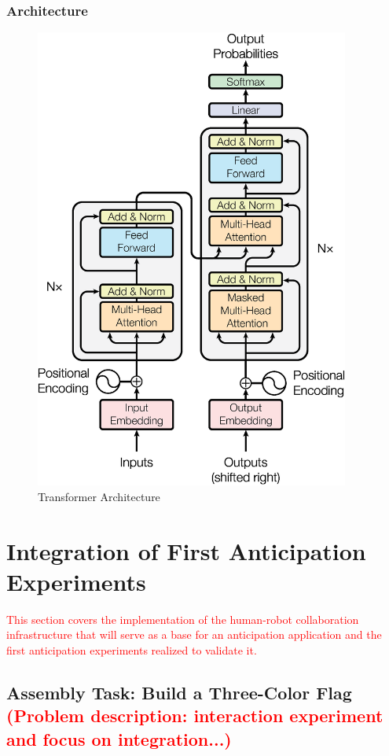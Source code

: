 \subsubsection{Architecture}

\begin{figure}[h]
\centerline{\includegraphics[height=6in]{figs/transformer.jpg}}
\caption[Transformer Architecture]{Transformer Architecture \cite{Vaswani2017}}
\label{fig:transformer_arch}
\end{figure}

\section{Integration of First Anticipation Experiments}

\textcolor{red}{This section covers the implementation of the human-robot collaboration infrastructure that will serve as a base for an anticipation application and the first anticipation experiments realized to validate it.}

\subsection{Assembly Task: Build a Three-Color Flag \textcolor{red}{(Problem description: interaction experiment and focus on integration...)}}

